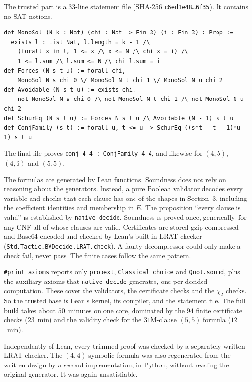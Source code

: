 \documentclass[11pt]{amsart}
\theoremstyle{definition}
\begin{document}
The trusted part is a $33$-line statement file (SHA-256
\texttt{c6ed1e48\dots6f35}). It contains no SAT notions.

\begin{lstlisting}
def MonoSol (N k : Nat) (chi : Nat -> Fin 3) (i : Fin 3) : Prop :=
  exists l : List Nat, l.length = k - 1 /\
    (forall x in l, 1 <= x /\ x <= N /\ chi x = i) /\
    1 <= l.sum /\ l.sum <= N /\ chi l.sum = i
def Forces (N s t u) := forall chi,
    MonoSol N s chi 0 \/ MonoSol N t chi 1 \/ MonoSol N u chi 2
def Avoidable (N s t u) := exists chi,
    not MonoSol N s chi 0 /\ not MonoSol N t chi 1 /\ not MonoSol N u chi 2
def SchurEq (N s t u) := Forces N s t u /\ Avoidable (N - 1) s t u
def ConjFamily (s t) := forall u, t <= u -> SchurEq ((s*t - t - 1)*u - 1) s t u
\end{lstlisting}

The final file proves \texttt{conj\_4\_4 : ConjFamily 4 4}, and
likewise for $(4,5)$, $(4,6)$ and $(5,5)$.

The formulas are generated by Lean functions. Soundness does not rely
on reasoning about the generators. Instead, a pure Boolean validator
decodes every variable and checks that each clause has one of the
shapes in Section~3, including the coefficient identities and
membership in $E$. The proposition ``every clause is valid'' is
established by \texttt{native\_decide}. Soundness is proved once,
generically, for any CNF all of whose clauses are valid. Certificates
are stored gzip-compressed and Base64-encoded and checked by Lean's
built-in LRAT checker (\texttt{Std.Tactic.BVDecide.LRAT.check}). A
faulty decompressor could only make a check fail, never pass. The
finite cases follow the same pattern.

\texttt{\#print axioms} reports only \texttt{propext},
\texttt{Classical.choice} and \texttt{Quot.sound}, plus the auxiliary
axioms that \texttt{native\_decide} generates, one per decided
computation. These cover the validators, the certificate checks and
the $\chi_2$ checks. So the trusted base is Lean's kernel, its
compiler, and the statement file. The full build takes about
$50$~minutes on one core, dominated by the $94$ finite certificate
checks ($23$~min) and the validity check for the $31$M-clause $(5,5)$
formula ($12$~min).

Independently of Lean, every trimmed proof was checked by a
separately written LRAT checker. The $(4,4)$ symbolic formula was
also regenerated from the written design by a second implementation,
in Python, without reading the original generator. It was again
unsatisfiable.
\end{document}
